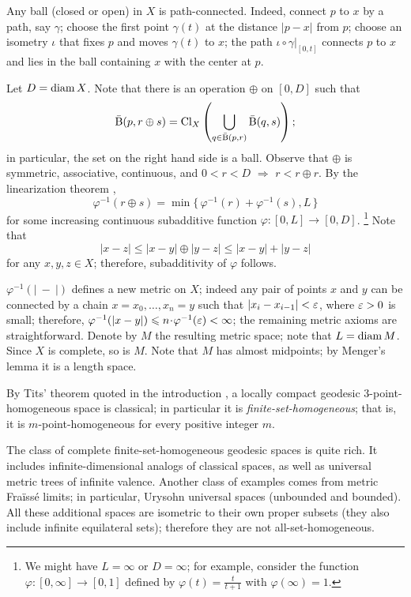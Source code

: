 \documentclass[a4paper,10pt]{article}
\begin{document}
Any ball (closed or open) in $X$ is path-connected.
Indeed, connect $p$ to $x$ by a path, say $\gamma$;
choose the first point $\gamma(t)$ at the distance $|p-x|$ from $p$;
choose an isometry $\iota$ that fixes $p$ and moves $\gamma(t)$ to $x$;
the path $\iota\circ\gamma|_{[0,t]}$ connects $p$ to $x$ and lies in the ball containing $x$ with the center at $p$.

Let $D=\mathop{\rm diam}\nolimits X$.
Note that there is an operation $\oplus$ on $[0,D]$ such that
\[\bar{\mathrm{B}}(p,r\oplus s)=\mathrm{Cl}_X\left(\bigcup_{q\in \bar{\mathrm{B}}(p,r)}\bar{\mathrm{B}}(q,s)\right);\]
in particular, the set on the right hand side is a ball.
Observe that $\oplus$ is symmetric, associative, continuous, and $0<r<D$ $\Rightarrow$ $r<r\oplus r$.
By the linearization theorem \cite[(3.3)]{ling1965},
\[\varphi^{-1}(r\oplus s)=\min\{\,\varphi^{-1}(r)+\varphi^{-1}(s),L\,\}\]
for some increasing continuous subadditive function $\varphi\colon[0,L]\to [0,D]$.%
\footnote{We might have $L=\infty$ or $D=\infty$; for example, consider the function $\varphi\colon[0,\infty]\to[0,1]$ defined by $\varphi(t)=\tfrac t{t+1}$ with $\varphi(\infty)=1$.}
Note that
\[|x-z|\leqslant |x-y|\oplus |y-z|\leqslant|x-y|+ |y-z|\]
for any $x,y,z\in X$; therefore, subadditivity of $\varphi$ follows.

$\varphi^{-1}(|\ -\ |)$ defines a new metric on $X$; indeed any pair of points $x$ and $y$ can be connected by a chain $x=x_0,\dots,x_n=y$ such that $|x_{i}-x_{i-1}|<\varepsilon$, where $\varepsilon>0$ is small; therefore, $\varphi^{-1}(|x -y|)\leqslant n\cdot \varphi^{-1}(\eps)<\infty$; the remaining metric axioms are straightforward.
Denote by $M$ the resulting metric space; note that $L=\mathop{\rm diam}\nolimits M$.
Since $X$ is complete, so is $M$.
Note that $M$ has almost midpoints; by Menger's lemma it is a length space.
\qeds

By Tits' theorem quoted in the introduction \cite{tits}, a locally compact geodesic 3-point-homogeneous space is classical; in particular it is  \emph{finite-set-homogeneous}; that is, it is $m$-point-homogeneous for every positive integer $m$.

The class of complete finite-set-homogeneous geodesic spaces is quite rich.
It includes infinite-dimensional analogs of classical spaces, as well as universal metric trees of infinite valence.
Another class of examples comes from metric Fraïssé limits;
in particular, Urysohn universal spaces (unbounded and bounded).
All these additional spaces are isometric to their own proper subsets (they also include infinite equilateral sets); therefore they are not all-set-homogeneous.
\end{document}
